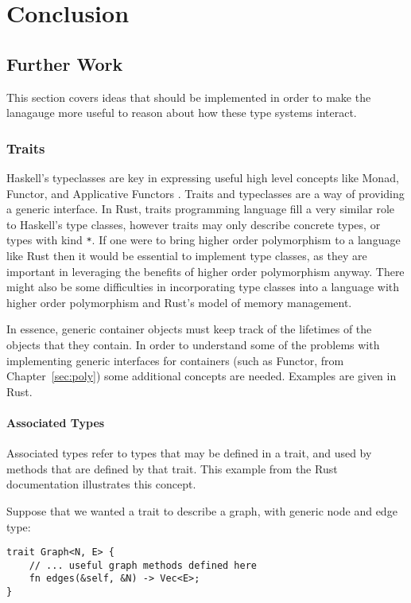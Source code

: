\chapter{Conclusion}\label{sec:conclusion}

\section{Further Work}
This section covers ideas that should be implemented in order to make the
lanagauge more useful to reason about how these type systems interact.

\subsection{Traits}
Haskell's typeclasses are key in expressing useful high level concepts like
Monad, Functor, and Applicative Functors \cite{consclasses}. Traits and
typeclasses are a way of providing a generic interface. In Rust, traits
programming language fill a very similar role to Haskell's type classes,
however traits may only describe concrete types, or types with kind
\lstinline{*}. If one were to bring higher order polymorphism to a language
like Rust then it would be essential to implement type classes, as they are
important in leveraging the benefits of higher order polymorphism anyway. There
might also be some difficulties in incorporating type classes into a language
with higher order polymorphism and Rust's model of memory management.

In essence, generic container objects must keep track of the lifetimes of the
objects that they contain.  In order to understand some of the problems with
implementing generic interfaces for containers (such as Functor, from
Chapter~\ref{sec:poly}) some additional concepts are needed. Examples are given
in Rust.

\subsubsection{Associated Types}
Associated types refer to types that may be defined in a trait, and used by
methods that are defined by that trait. This example from the Rust
documentation \cite{assoctypes} illustrates this concept.

Suppose that we wanted a trait to describe a graph, with generic node and edge
type:

\begin{lstlisting}[nolol]
trait Graph<N, E> {
    // ... useful graph methods defined here
    fn edges(&self, &N) -> Vec<E>;
}
\end{lstlisting}

